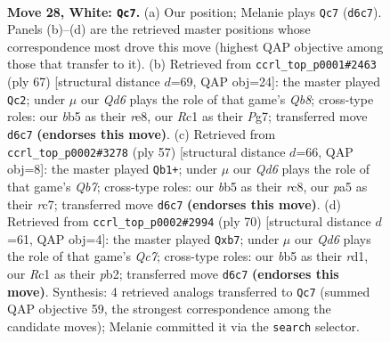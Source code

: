 \documentclass[11pt]{article}
\begin{document}
\clearpage

\begin{figure}[p]\centering
\begin{subfigure}{0.46\textwidth}\centering
\resizebox{\linewidth}{!}{%
\newchessgame
\chessboard[
  setfen={4k3/3n4/r2Q4/pb1Ppp2/6p1/8/PPP2PP1/2R1K3 w - - 1 28},
  showmover=false,
  pgfstyle=straightmove, color=movearrow, markmove={d6-c7}
]}
\caption{}
\end{subfigure}\hfill
\begin{subfigure}{0.46\textwidth}\centering
\resizebox{\linewidth}{!}{%
\newchessgame
\chessboard[
  setfen={4R3/5ppk/8/7p/8/1P1p1PP1/3B1K1P/1q3R2 b - - 5 34},
  showmover=false,
  pgfstyle=straightmove, color=movearrow, markmove={b1-c2}
]}
\caption{}
\end{subfigure}
\\[4pt]
\begin{subfigure}{0.46\textwidth}\centering
\resizebox{\linewidth}{!}{%
\newchessgame
\chessboard[
  setfen={2R5/p1R2ppk/8/1B1p3p/1n6/1P4P1/1q3P1P/6K1 b - - 2 29},
  showmover=false,
  pgfstyle=straightmove, color=movearrow, markmove={b2-b1}
]}
\caption{}
\end{subfigure}\hfill
\begin{subfigure}{0.46\textwidth}\centering
\resizebox{\linewidth}{!}{%
\newchessgame
\chessboard[
  setfen={5k2/1bQ3p1/1p4P1/2b2p2/3p1P2/8/1p3PKP/3r4 w - - 2 36},
  showmover=false,
  pgfstyle=straightmove, color=movearrow, markmove={c7-b7}
]}
\caption{}
\end{subfigure}
\caption{\textbf{Move 28, White: \texttt{Qc7}.} (a) Our position; Melanie plays \texttt{Qc7} (\texttt{d6c7}). Panels (b)--(d) are the retrieved master positions whose correspondence most drove this move (highest QAP objective among those that transfer to it). (b) Retrieved from \texttt{ccrl\_top\_p0001\#2463} (ply 67) [structural distance $d$=69, QAP obj=24]: the master played \texttt{Qc2}; under $\mu$ our \emph{Qd6} plays the role of that game's \emph{Qb8}; cross-type roles: our \emph{b}b5 as their \emph{r}e8, our \emph{R}c1 as their \emph{P}g7; transferred move \texttt{d6c7} \textbf{(endorses this move)}. (c) Retrieved from \texttt{ccrl\_top\_p0002\#3278} (ply 57) [structural distance $d$=66, QAP obj=8]: the master played \texttt{Qb1+}; under $\mu$ our \emph{Qd6} plays the role of that game's \emph{Qb7}; cross-type roles: our \emph{b}b5 as their \emph{r}c8, our \emph{p}a5 as their \emph{r}c7; transferred move \texttt{d6c7} \textbf{(endorses this move)}. (d) Retrieved from \texttt{ccrl\_top\_p0002\#2994} (ply 70) [structural distance $d$=61, QAP obj=4]: the master played \texttt{Qxb7}; under $\mu$ our \emph{Qd6} plays the role of that game's \emph{Qc7}; cross-type roles: our \emph{b}b5 as their \emph{r}d1, our \emph{R}c1 as their \emph{p}b2; transferred move \texttt{d6c7} \textbf{(endorses this move)}. Synthesis: 4 retrieved analogs transferred to \texttt{Qc7} (summed QAP objective 59, the strongest correspondence among the candidate moves); Melanie committed it via the \texttt{search} selector.}
\label{fig:thought-m54}
\end{figure}
\end{document}
